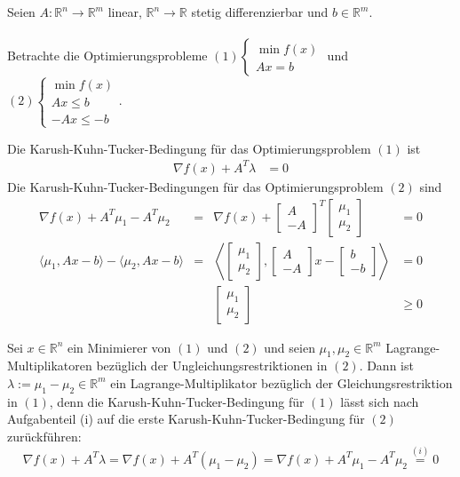 Seien $A: \mathbb R^n\to \mathbb R^m$ linear, $\mathbb R^n\to \mathbb R$ stetig differenzierbar und $b\in\mathbb R^m$.\\\\
Betrachte die Optimierungsprobleme $(1)\begin{cases}\min f(x)\\Ax=b\end{cases}$ und $(2)\begin{cases}\min f(x)\\Ax\leq b\\-Ax\leq -b\end{cases}$.\newline\newline
\begin{compactenum}[(i)]
\item Die Karush-Kuhn-Tucker-Bedingung für das Optimierungsproblem $(1)$ ist
\begin{align*}
\nabla f(x)+A^T\lambda&=0
\end{align*}
Die Karush-Kuhn-Tucker-Bedingungen für das Optimierungsproblem $(2)$ sind
\begin{align*}
\nabla f(x)+A^T\mu_1-A^T\mu_2&=&\nabla f(x)+\begin{bmatrix} A\\-A\end{bmatrix}^T\begin{bmatrix} \mu_1\\\mu_2\end{bmatrix}&=0\\
\langle \mu_1,Ax-b\rangle-\langle \mu_2,Ax-b\rangle&=&\left\langle \begin{bmatrix} \mu_1\\\mu_2\end{bmatrix},\begin{bmatrix} A\\-A\end{bmatrix}x-\begin{bmatrix} b\\-b\end{bmatrix}\right\rangle&=0\\
&&\begin{bmatrix} \mu_1\\\mu_2\end{bmatrix}&\geq0
\end{align*}
\item Sei $x\in\mathbb R^n$ ein Minimierer von $(1)$ und $(2)$ und seien $\mu_1,\mu_2\in\mathbb R^m$ Lagrange-Multiplikatoren bezüglich der Ungleichungsrestriktionen in $(2)$. Dann ist $\lambda:=\mu_1-\mu_2\in\mathbb R^m$ ein Lagrange-Multiplikator bezüglich der Gleichungsrestriktion in $(1)$, denn die Karush-Kuhn-Tucker-Bedingung für $(1)$ lässt sich nach Aufgabenteil (i) auf die erste Karush-Kuhn-Tucker-Bedingung für $(2)$ zurückführen: $$\nabla f(x)+A^T\lambda=\nabla f(x)+A^T(\mu_1-\mu_2)=\nabla f(x)+A^T\mu_1-A^T\mu_2\overset{(i)}=0$$\newline

\end{compactenum}
